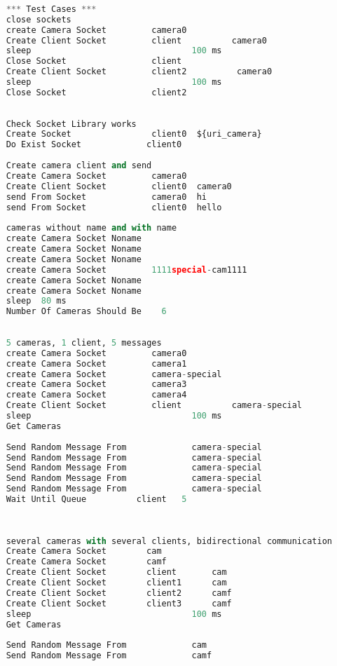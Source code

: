 \documentclass[hidelinks,11pt,a4paper,oneside,article]{memoir}
\begin{document}
\begin{lstlisting}[label={listing:robottest},caption={RobotFramework test file},language=Python, style=styleprogramming]
    
    *** Test Cases ***
    close sockets
    create Camera Socket         camera0
    Create Client Socket         client          camera0
    sleep                                100 ms
    Close Socket                 client
    Create Client Socket         client2          camera0
    sleep                                100 ms
    Close Socket                 client2
    
    
    Check Socket Library works
    Create Socket                client0  ${uri_camera}
    Do Exist Socket             client0
    
    Create camera client and send
    Create Camera Socket         camera0
    Create Client Socket         client0  camera0
    send From Socket             camera0  hi
    send From Socket             client0  hello
    
    cameras without name and with name
    create Camera Socket Noname
    create Camera Socket Noname
    create Camera Socket Noname
    create Camera Socket         1111special-cam1111
    create Camera Socket Noname
    create Camera Socket Noname
    sleep  80 ms
    Number Of Cameras Should Be    6
    
    
    5 cameras, 1 client, 5 messages
    create Camera Socket         camera0
    create Camera Socket         camera1
    create Camera Socket         camera-special
    create Camera Socket         camera3
    create Camera Socket         camera4
    Create Client Socket         client          camera-special
    sleep                                100 ms
    Get Cameras
    
    Send Random Message From             camera-special
    Send Random Message From             camera-special
    Send Random Message From             camera-special
    Send Random Message From             camera-special
    Send Random Message From             camera-special
    Wait Until Queue          client   5
    
    
    
    several cameras with several clients, bidirectional communication
    Create Camera Socket        cam
    Create Camera Socket        camf
    Create Client Socket        client       cam
    Create Client Socket        client1      cam
    Create Client Socket        client2      camf
    Create Client Socket        client3      camf
    sleep                                100 ms
    Get Cameras
    
    Send Random Message From             cam
    Send Random Message From             camf
    

\end{lstlisting}
\end{document}
